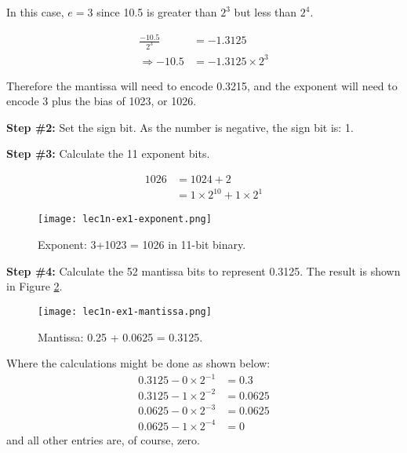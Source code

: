 \vspace{0.1cm} 

\noindent In this case, $e=3$ since 10.5 is greater than $2^3$ but less than $2^4$.  

\begin{align*}
\frac{-10.5}{2^3} & = -1.3125 \\
\Rightarrow -10.5 &= -1.3125 \times 2^3
\end{align*}

\noindent Therefore the mantissa will need to encode 0.3215, and the exponent will need to encode 3 plus the bias of 1023, or 1026.

\vspace{0.25cm}

\noindent\textbf{Step \#2:} Set the sign bit. As the number is negative, the sign bit is: 1.



\noindent\textbf{Step \#3:} Calculate the 11 exponent bits.  

\begin{align*}
1026 &= 1024 + 2 \\
&= 1 \times 2^{10} + 1 \times 2^{1}
\end{align*}


\begin{figure}
\texttt{[image: lec1n-ex1-exponent.png]}
\caption{Exponent: 3+1023 = 1026 in 11-bit binary.}
\label{fig:lec1n-ex1-exponent}
\end{figure}   
  

\vspace{0.25cm}

\noindent\textbf{Step \#4:} Calculate the 52 mantissa bits to represent 0.3125.  The result is shown in Figure \ref{fig:lec1n-ex1-mantissa}.

\begin{figure}
\texttt{[image: lec1n-ex1-mantissa.png]}
\caption{Mantissa: 0.25 + 0.0625 = 0.3125.}
\label{fig:lec1n-ex1-mantissa}
\end{figure}

\noindent Where the calculations might be done as shown below:
\begin{align*}
0.3125 - 0 \times 2^{-1} &= 0.3 \\
0.3125 - 1 \times 2^{-2} &= 0.0625 \\
0.0625 - 0 \times 2^{-3} &= 0.0625 \\
0.0625 - 1 \times 2^{-4} &= 0
\end{align*}
and all other entries are, of course, zero.


